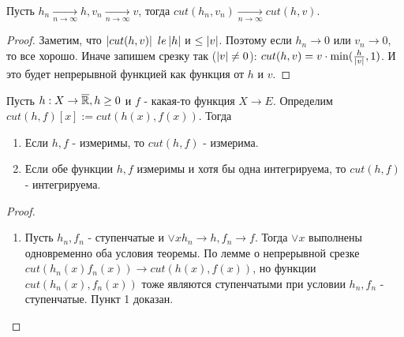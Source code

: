 \begin{lemma*}
    Пусть $h_n \underset{n \to \infty}{\to} h, v_n \underset{n \to \infty}{\to} v$, тогда $cut(h_n, v_n) \underset{n \to \infty}{\to}cut(h, v)$.
    \begin{proof}
        Заметим, что $\left| cut(h, v) \right|$ $le \left| h \right|$ и $\le \left| v \right|$. Поэтому если $h_n \to 0$ или $v_n \to 0$, то все хорошо. Иначе запишем срезку так ($\left| v \right| \neq 0$): $cut(h, v) = v \cdot \min(\frac{h}{\left| v \right|}, 1)$. И это будет непрерывной функцией как функция от $h$ и $v$.
    \end{proof}
\end{lemma*}

\begin{theorem*}
    Пусть $h: X \to \overline{\mathbb{R}}, h \ge 0$ и $f$ - какая-то функция $X \to E$. Определим $cut(h, f)[x] := cut(h(x), f(x))$. Тогда
    \begin{enumerate}
        \item Если $h, f$ - измеримы, то $cut(h, f)$ - измерима.
        \item Если обе функции $h, f$ измеримы и хотя бы одна интегрируема, то $cut(h,f)$ - интегрируема.
    \end{enumerate}

    \begin{proof}
        \begin{enumerate}
            \item Пусть $h_n, f_n$ - ступенчатые и $\vee x h_n \to h, f_n \to f$. \newline
            Тогда $\vee x$ выполнены одновременно оба условия теоремы. По лемме о непрерывной срезке $cut(h_n(x) f_n(x)) \to cut(h(x), f(x))$, но функции $cut(h_n(x), f_n(x))$ тоже являются ступенчатыми при условии $h_n, f_n$ - ступенчатые. Пункт 1 доказан.
            

\end{enumerate}
\end{proof}
\end{theorem*}
